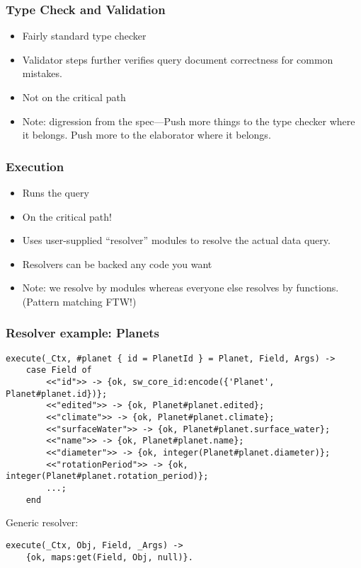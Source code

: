 \documentclass[lualatex]{beamer}
\begin{document}
\begin{frame}
  \frametitle{Type Check and Validation}
  \begin{itemize}
  \item Fairly standard type checker
  \item Validator steps further verifies query document correctness
    for common mistakes.
  \item Not on the critical path
  \item Note: digression from the spec---Push more things to the type
    checker where it belongs. Push more to the elaborator where it belongs.
  \end{itemize}
\end{frame}

\begin{frame}
  \frametitle{Execution}
  \begin{itemize}
  \item Runs the query
  \item On the critical path!
  \item Uses user-supplied ``resolver'' modules to resolve the
    actual data query.
  \item Resolvers can be backed any code you want
  \item Note: we resolve by modules whereas everyone else resolves by
    functions. (Pattern matching FTW!)
  \end{itemize}
\end{frame}

\begin{frame}
  \frametitle{Resolver example: Planets}
\begin{verbatim}
execute(_Ctx, #planet { id = PlanetId } = Planet, Field, Args) ->
    case Field of
        <<"id">> -> {ok, sw_core_id:encode({'Planet', Planet#planet.id})};
        <<"edited">> -> {ok, Planet#planet.edited};
        <<"climate">> -> {ok, Planet#planet.climate};
        <<"surfaceWater">> -> {ok, Planet#planet.surface_water};
        <<"name">> -> {ok, Planet#planet.name};
        <<"diameter">> -> {ok, integer(Planet#planet.diameter)};
        <<"rotationPeriod">> -> {ok, integer(Planet#planet.rotation_period)};
        ...;
    end
\end{verbatim}
  Generic resolver:
\begin{verbatim}
execute(_Ctx, Obj, Field, _Args) ->
    {ok, maps:get(Field, Obj, null)}.
\end{verbatim}
\end{frame}
\end{document}
